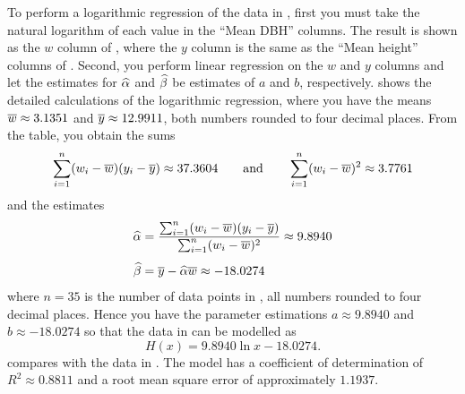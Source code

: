 \documentclass[a4paper,oneside,12pt]{article}
\begin{document}
{\begin{solution}
\begin{table}[!htbp]
\centering

\caption{%
  Detailed calculations of the logarithmic regression of the data in
  .  The $x$ and $y$ columns are the same
  as the ``Mean DBH'' and ``Mean height'' columns of
  .  Each value in the $w$ column is the
  natural logarithmic transformation of the corresponding value in the
  $x$ column, i.e.~$w_i = \ln x_i$.  If $\wbar$ and $\ybar$ are the
  means of the $w$ and $y$ columns, respectively, then
  $d(w_i) = w_i - \wbar$ and $d(y_i) = y_i - \ybar$.  Most values in
  the table have been rounded to four decimal places so as to fit the
  table.  However, you should not round these intermediate results
  when you do your own calculations.
}
\label{tab:logarithm:Sombo_log_regression}
\end{table}

To perform a logarithmic regression of the data in
, first you must take the natural logarithm
of each value in the ``Mean DBH'' columns.  The result is shown as the
$w$ column of , where the
$y$ column is the same as the ``Mean height'' columns of
.  Second, you perform linear regression on
the $w$ and $y$ columns and let the estimates for $\widehat{\alpha}$ and
$\widehat{\beta}$ be estimates of $a$ and $b$, respectively.
 shows the detailed
calculations of the logarithmic regression, where you have the means
$\overline{w} \approx 3.1351$ and $\overline{y} \approx 12.9911$, both numbers
rounded to four decimal places.  From the table, you obtain the sums
\[
\sum_{i=1}^n (w_i - \overline{w}) (y_i - \overline{y})
\approx
37.3604
\qquad
\text{and}
\qquad
\sum_{i=1}^n (w_i - \overline{w})^2
\approx
3.7761
\]
and the estimates
\begin{align*}
\widehat{\alpha}
&=
\frac{
  \sum_{i=1}^n (w_i - \overline{w}) (y_i - \overline{y})
}{
  \sum_{i=1}^n (w_i - \overline{w})^2
}
\approx
9.8940 \\[4pt]
\widehat{\beta}
&=
\overline{y} - \widehat{\alpha} \overline{w}
\approx
-18.0274
\end{align*}
where $n = 35$ is the number of data points in
, all numbers rounded to four decimal
places.  Hence you have the parameter estimations
$a \approx 9.8940$ and $b \approx -18.0274$ so that the data in
 can be modelled as
\begin{equation}
\label{eqn:logarithm:Sombo_log_regression}
H(x)
=
9.8940 \ln x - 18.0274.
\end{equation}
 compares
 with the data in
.  The model has a coefficient of
determination of $R^2 \approx 0.8811$ and a root mean square error of
approximately $1.1937$.


\end{solution}}
\end{document}
